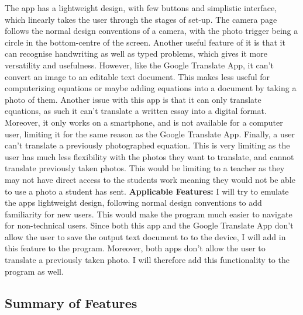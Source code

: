 \documentclass{report}
\begin{document}
\newline
The app has a lightweight design, with few buttons and simplistic interface, which linearly takes the user through the stages of set-up. The camera page follows the normal design conventions of a camera, with the photo trigger being a circle in the bottom-centre of the screen. Another useful feature of it is that it can recognise handwriting as well as typed problems, which gives it more versatility and usefulness.
\newline
However, like the Google Translate App, it can't convert an image to an editable text document. This makes less useful for computerizing equations or maybe adding equations into a document by taking a photo of them. Another issue with this app is that it can only translate equations, as such it can't translate a written essay into a digital format. Moreover, it only works on a smartphone, and is not available for a computer user, limiting it for the same reason as the Google Translate App. Finally, a user can't translate a previously photographed equation. This is very limiting as the user has much less flexibility with the photos they want to translate, and cannot translate previously taken photos. This would be limiting to a teacher as they may not have direct access to the students work meaning they would not be able to use a photo a student has sent.
\newline
\newline
\textbf{Applicable Features:}
\newline
I will try to emulate the apps lightweight design, following normal design conventions to add familiarity for new users. This would make the program much easier to navigate for non-technical users. Since both this app and the Google Translate App don't allow the user to save the output text document to to the device, I will add in this feature to the program. Moreover, both apps don't allow the user to translate a previously taken photo. I will therefore add this functionality to the program as well.
\newpage
\subsection{Summary of Features}
\end{document}
